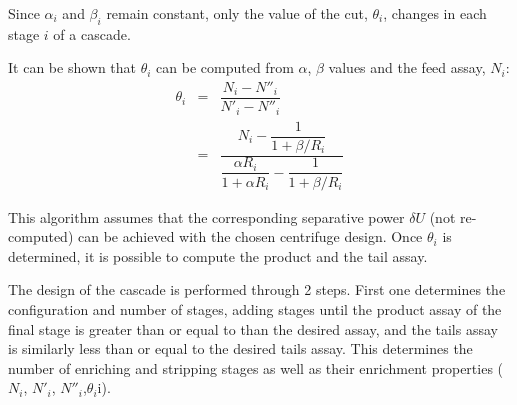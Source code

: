 \documentclass{anstrans}
\begin{document}
Since $\alpha_{i}$ and $\beta_{i}$ remain constant, only the value of the cut,
$\theta_{i}$, changes in each stage $i$ of a cascade.

It can be shown that $\theta_{i}$ can be computed from $\alpha$,
$\beta$ values and the feed assay, $N_{i}$:
\begin{eqnarray}
    \theta_{i} &=& \dfrac{N_{i} - N''_{i}}{N'_{i}-N''_{i}}\nonumber\\
           &=& \dfrac{N_{i} - \dfrac{1}{1 + \beta/R_{i}}}{ \dfrac{\alpha R_{i}}{1 + \alpha R_{i}} -
           \dfrac{1}{1 + \beta/R_{i}}}
\end{eqnarray}

This algorithm assumes that the corresponding separative power $\delta U$ (not
re-computed) can be achieved with the chosen centrifuge design. Once
$\theta_{i}$ is determined, it is possible to compute the product and the tail
assay.

The design of the cascade is performed through 2 steps. First one determines the
configuration and number of stages, adding stages until the product assay of the final stage is greater than or equal to than the desired assay, and the tails assay is similarly less than or equal to the desired tails assay. This determines the number of enriching and stripping stages as
well as their enrichment properties ($N_{i}$, $N'_{i}$,
$N''_{i}$,$\theta_{i}$i).
\end{document}
